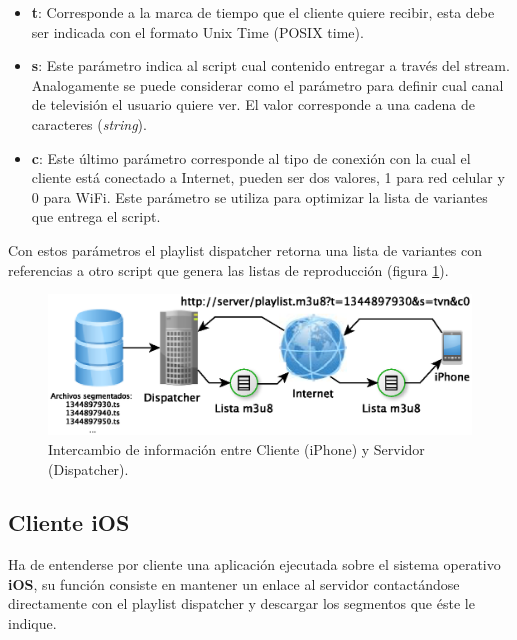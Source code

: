 \begin{itemize}
	\item \textbf{t}: Corresponde a la marca de tiempo que el cliente quiere recibir, esta debe ser indicada con el formato Unix Time (POSIX time).
	\item \textbf{s}: Este parámetro indica al script cual contenido entregar a través del stream. Analogamente se puede considerar como el parámetro para definir cual canal de televisión el usuario quiere ver. El valor corresponde a una cadena de caracteres (\textit{string}).
	\item \textbf{c}: Este último parámetro corresponde al tipo de conexión con la cual el cliente está conectado a Internet, pueden ser dos valores, 1 para red celular y 0 para WiFi. Este parámetro se utiliza para optimizar la lista de variantes que entrega el script.
\end{itemize}
		
Con estos parámetros el playlist dispatcher retorna una lista de variantes con referencias a otro script que genera las listas de reproducción (figura \ref{diagramaHLSAltaVoz}).


	\begin{figure}[H]
		\centering
		\includegraphics[scale=0.8]{imgs/diagrama-HLS-AltaVoz.eps}
		\caption{Intercambio de información entre Cliente (iPhone) y Servidor (Dispatcher).}
		\label{diagramaHLSAltaVoz}
	\end{figure}		
		
	\subsection{Cliente iOS}
Ha de entenderse por cliente una aplicación ejecutada sobre el sistema operativo \textbf{iOS}, su función consiste en mantener un enlace al servidor contactándose directamente con el playlist dispatcher y descargar los segmentos que éste le indique.\\

